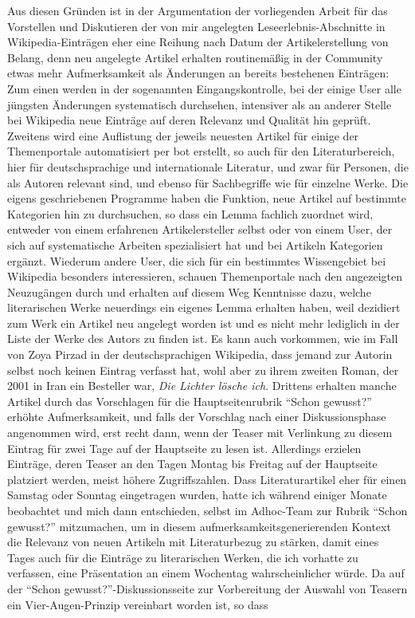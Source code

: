 \documentclass[fontsize=12pt]{scrartcl}
\begin{document}
Aus diesen Gr\"unden ist in der Argumentation der vorliegenden Arbeit f\"ur das Vor\-stel\-len und Diskutieren der von mir angelegten Leseerlebnis-Abschnitte in Wi\-ki\-pe\-dia-Ein\-tr\"a\-gen eher eine Reihung nach Datum der Artikelerstellung von Belang, denn neu angelegte Artikel erhalten routinem\"a{\ss}ig in der Community etwas mehr Aufmerksamkeit als \"Anderungen an bereits bestehenen Eintr\"agen: Zum einen werden in der sogenannten Eingangskontrolle, bei der einige \mbox{User} alle j\"ungsten \"Anderungen systematisch durchsehen, intensiver als an an\-de\-rer Stelle bei Wi\-ki\-pe\-dia neue Eintr\"age auf deren Relevanz und Qualit\"at hin gepr\"uft. Zwei\-tens wird eine Auflistung der jeweils neuesten Artikel f\"ur einige der Themenportale automatisiert per bot erstellt, so auch f\"ur den Li\-te\-ra\-tur\-bereich, \mbox{hier} f\"ur deutschspra\-chi\-ge und internationale Li\-te\-ra\-tur, und zwar f\"ur Per\-so\-nen, die als Autoren\textsuperscript{\tiny *} relevant sind, und ebenso f\"ur Sachbegriffe wie f\"ur einzelne Werke. Die eigens geschriebenen Programme haben die Funktion, neue Artikel auf bestimmte Kategorien hin zu durchsuchen, so dass ein Lemma fachlich zuordnet wird, entweder von einem erfahrenen Artikelersteller\textsuperscript{\tiny *} \mbox{selbst} oder von einem User, der\textsuperscript{\tiny *} sich auf systematische Arbei\-ten spezialisiert hat und bei Artikeln Kategorien erg\"anzt. Wiederum andere User, die sich f\"ur ein be\-stimmtes Wissengebiet bei Wi\-ki\-pe\-dia besonders interessieren, schauen Themenportale nach den angezeigten Neuzug\"angen durch und erhalten auf diesem Weg Kenntnisse dazu, welche li\-te\-ra\-rischen Werke neuerdings ein eigenes Lemma erhalten haben, weil dezidiert zum Werk ein Artikel neu angelegt worden ist und es nicht mehr lediglich in der Liste der Werke des Autors\textsuperscript{\tiny *} zu finden ist. Es kann auch vorkommen, wie im Fall von Zoya Pirzad in der deutschspra\-chi\-gen Wi\-ki\-pe\-dia, dass jemand zur Autorin\textsuperscript{\tiny *} \mbox{selbst} noch keinen Eintrag verfasst hat, wohl aber zu ihrem zweiten Roman, der 2001 in Iran ein Besteller war, \textit{Die Lichter l\"osche ich}. Drittens erhalten manche Artikel durch das Vorschlagen f\"ur die Hauptsei\-tenrubrik "`Schon gewusst?"' erh\"ohte Aufmerksamkeit, und falls der Vorschlag nach einer Dis\-kus\-si\-onsphase angenommen wird, erst recht dann, wenn der Teaser mit Verlinkung zu diesem Eintrag f\"ur zwei Tage auf der Hauptseite zu lesen ist. Al\-ler\-dings erzielen Eintr\"age, deren Teaser an den Tagen Montag bis Freitag auf der Hauptseite platziert werden, meist h\"ohere Zugriffszahlen. Dass Li\-te\-ra\-tur\-artikel eher f\"ur einen Samstag oder Sonntag eingetragen wurden, hatte ich w\"ahrend einiger Monate beobachtet und mich dann entschieden, \mbox{selbst} im Adhoc-Team zur Rubrik "`Schon gewusst?"' mitzumachen, um in diesem aufmerksamkeitsgenerierenden Kontext die Relevanz von neuen Artikeln mit Li\-te\-ra\-tur\-bezug zu st\"arken, damit eines Tages auch f\"ur die Eintr\"age zu li\-te\-ra\-rischen Werken, die ich vorhatte zu verfassen, eine Pr\"asentation an einem Wochentag wahrscheinlicher w\"urde. Da auf der "`Schon gewusst?"'-Dis\-kus\-si\-onsseite zur Vorbereitung der Auswahl von Teasern ein Vier-Augen-Prinzip vereinbart worden ist, so dass 
\end{document}
